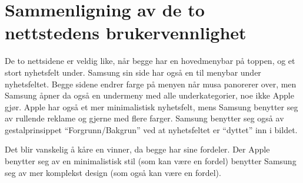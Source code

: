 \section{Sammenligning av de to nettstedens brukervennlighet}

De to nettsidene er veldig like, når begge har en hovedmenybar på toppen, og et stort nyhetsfelt under. Samsung sin side har også en til menybar under nyhetsfeltet. Begge sidene endrer farge på menyen når musa panorerer over, men Samsung åpner da også en undermeny med alle underkategorier, noe ikke Apple gjør. Apple har også et mer minimalistisk nyhetsfelt, mens Samsung benytter seg av rullende reklame og gjerne med flere farger. Samsung benytter seg også av gestalprinsippet ``Forgrunn/Bakgrun'' ved at nyhetsfeltet er ``dyttet'' inn i bildet. 

Det blir vanskelig å kåre en vinner, da begge har sine fordeler. Der Apple benytter seg av en minimalistisk stil (som kan være en fordel) benytter Samsung seg av mer komplekst design (som også kan være en fordel). 